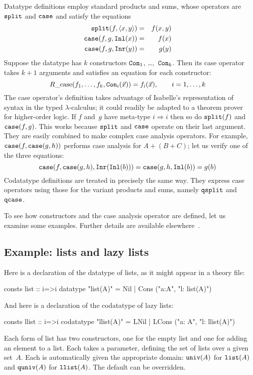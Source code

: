 \documentclass[12pt]{article}
\let\To=\Rightarrow
\newcommand\split{\hbox{\tt split}}
\newcommand\univ{\hbox{\tt univ}}
\newcommand\Inl{\hbox{\tt Inl}}
\newcommand\Inr{\hbox{\tt Inr}}
\newcommand\case{\hbox{\tt case}}
\newcommand\lst{\hbox{\tt list}}
\newcommand\quniv{\hbox{\tt quniv}}
\newcommand\llist{\hbox{\tt llist}}
\newcommand\qsplit{\hbox{\tt qsplit}}
\newcommand\qcase{\hbox{\tt qcase}}
\newcommand\Con{\hbox{\tt Con}}
\begin{document}
Datatype definitions employ standard products and sums, whose operators are
$\split$ and $\case$ and satisfy the equations
\begin{eqnarray*}
  \split(f,\pair{x,y})  & = &  f(x,y) \\
  \case(f,g,\Inl(x))    & = &  f(x)   \\
  \case(f,g,\Inr(y))    & = &  g(y)
\end{eqnarray*}
Suppose the datatype has $k$ constructors $\Con_1$, \ldots,~$\Con_k$.  Then
its case operator takes $k+1$ arguments and satisfies an equation for each
constructor:
\[ R\hbox{\_case}(f_1,\ldots,f_k, {\tt Con}_i(\vec{x})) = f_i(\vec{x}),
    \qquad i = 1, \ldots, k
\]
The case operator's definition takes advantage of Isabelle's representation of
syntax in the typed $\lambda$-calculus; it could readily be adapted to a
theorem prover for higher-order logic.  If $f$ and~$g$ have meta-type $i\To i$
then so do $\split(f)$ and $\case(f,g)$.  This works because $\split$ and
$\case$ operate on their last argument.  They are easily combined to make
complex case analysis operators.  For example, $\case(f,\case(g,h))$ performs
case analysis for $A+(B+C)$; let us verify one of the three equations:
\[ \case(f,\case(g,h), \Inr(\Inl(b))) = \case(g,h,\Inl(b)) = g(b) \]
Codatatype definitions are treated in precisely the same way.  They express
case operators using those for the variant products and sums, namely
$\qsplit$ and~$\qcase$.

\medskip

To see how constructors and the case analysis operator are defined, let us
examine some examples.  Further details are available
elsewhere~\cite{paulson-set-II}.


\subsection{Example: lists and lazy lists}\label{lists-sec}
Here is a declaration of the datatype of lists, as it might appear in a theory
file:
\begin{ttbox} 
consts  list :: i=>i
datatype "list(A)" = Nil | Cons ("a:A", "l: list(A)")
\end{ttbox}
And here is a declaration of the codatatype of lazy lists:
\begin{ttbox}
consts  llist :: i=>i
codatatype "llist(A)" = LNil | LCons ("a: A", "l: llist(A)")
\end{ttbox}

Each form of list has two constructors, one for the empty list and one for
adding an element to a list.  Each takes a parameter, defining the set of
lists over a given set~$A$.  Each is automatically given the appropriate
domain: $\univ(A)$ for $\lst(A)$ and $\quniv(A)$ for $\llist(A)$.  The default
can be overridden.
\end{document}
